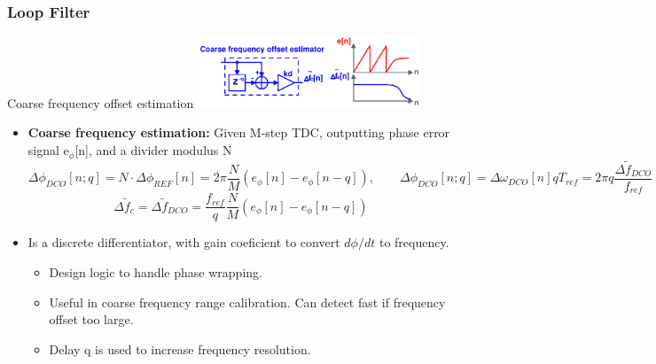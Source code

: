 \documentclass[t, screen, aspectratio=43]{beamer}
\begin{document}
\begin{frame}
	\frametitle{Loop Filter}
	\begin{block}{Coarse frequency offset estimation}
		\vspace{-0.5em}
		\center\includegraphics[width=0.5\textwidth, angle=0]{coarse_est.pdf}
		\begin{itemize}
			\footnotesize
			\item \textbf{Coarse frequency estimation:} Given M-step TDC, outputting phase error signal e$_\phi$[n], and a divider modulus N
			\tiny
			\vspace{-1em}
			\begin{equation}
				\Delta \phi_{DCO}[n; q] = N\cdot\Delta \phi_{REF}[n] = 2\pi \frac{N}{M}\left( e_\phi[n]-e_\phi[n-q]\right ),\hspace{2em} \Delta \phi_{DCO}[n; q] = \Delta \omega_{DCO}[n]qT_{ref} = 2\pi q \frac{\Delta \tilde f_{DCO}}{f_{ref}}
			\end{equation}
			\vspace{-1em}
			\begin{equation}
				\Delta \tilde f_{c} =\Delta \tilde f_{DCO} = \frac{f_{ref}}{q}\frac{N}{M}\left( e_\phi[n]-e_\phi[n-q]\right )
			\end{equation}				
			\footnotesize	
			\item Is a discrete differentiator, with gain coeficient to convert $d\phi/dt$ to frequency. 
			\begin{itemize}
				\scriptsize
				\item Design logic to handle phase wrapping.	
				\item Useful in coarse frequency range calibration. Can detect fast if frequency offset too large.
				\item Delay q is used to increase frequency resolution. 
			\end{itemize}			
		\end{itemize} 	
	\end{block}
\end{frame}
\end{document}
